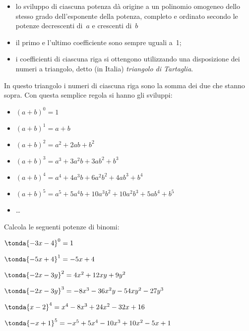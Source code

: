 \begin{itemize} [nosep]
\item lo sviluppo di ciascuna potenza dà origine a un polinomio
omogeneo dello stesso grado dell'esponente della
potenza, completo e ordinato secondo le potenze decrescenti di~\(a\) e 
crescenti di~\(b\)
\item il primo e l'ultimo coefficiente sono sempre uguali a~1;
\item i coefficienti di ciascuna riga si ottengono utilizzando una
disposizione dei numeri a triangolo, detto (in Italia) 
\emph{triangolo di Tartaglia}.
\end{itemize}


In questo triangolo i numeri di ciascuna riga 
sono la somma dei due che stanno sopra.
Con questa semplice regola si hanno gli sviluppi:

\begin{itemize} [nosep]
\item \((a+b)^{0}=1\)
\item \((a+b)^{1}=a+b\)
\item \((a+b)^{2}=a^{2}+2{ab}+b^{2}\)
\item \((a+b)^{3}=a^{3}+3a^{2}b+3{ab}^{2}+b^{3}\)
\item \((a+b)^{4}=a^{4}+4a^{3}b+6a^{2}b^{2}+4{ab}^{3}+b^{4}\)
\item \((a+b)^{5}=a^{5}+5a^{4}b+10a^{3}b^{2}+10a^{2}b^{3}+5{ab}^{4}+b^{5}\)
\item \dots
\end{itemize}

\begin{esempio}{}{} Calcola le seguenti potenze di binomi:
\begin{enumeratea}
\item \(\tonda{-3x-4}^0  = 1\)
\item \(\tonda{-5x+4}^1  = -5x+4\)
\item \(\tonda{-2x-3y}^2 = 4x^2+12xy+9y^2\)
\item \(\tonda{-2x-3y}^3 = -8x^3-36x^2y-54xy^2-27y^3\)
\item \(\tonda{x-2}^4    = x^4 -8x^3+24x^2-32x+16\)
\item \(\tonda{-x+1}^5   = -x^5 +5x^4-10x^3+10x^2-5x+1\)
\end{enumeratea}
\end{esempio}

